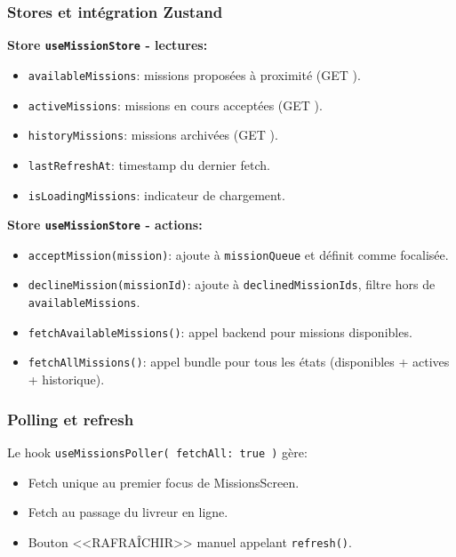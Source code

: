 \subsubsection{Stores et intégration Zustand}

\textbf{Store \texttt{useMissionStore} - lectures:}
\begin{itemize}
    \item \texttt{availableMissions}: missions proposées à proximité (GET ).
    \item \texttt{activeMissions}: missions en cours acceptées (GET ).
    \item \texttt{historyMissions}: missions archivées (GET ).
    \item \texttt{lastRefreshAt}: timestamp du dernier fetch.
    \item \texttt{isLoadingMissions}: indicateur de chargement.
\end{itemize}

\textbf{Store \texttt{useMissionStore} - actions:}
\begin{itemize}
    \item \texttt{acceptMission(mission)}: ajoute à \texttt{missionQueue} et définit comme focalisée.
    \item \texttt{declineMission(missionId)}: ajoute à \texttt{declinedMissionIds}, filtre hors de \texttt{availableMissions}.
    \item \texttt{fetchAvailableMissions()}: appel backend pour missions disponibles.
    \item \texttt{fetchAllMissions()}: appel bundle pour tous les états (disponibles + actives + historique).
\end{itemize}

\subsubsection{Polling et refresh}

Le hook \texttt{useMissionsPoller({ fetchAll: true })} gère:
\begin{itemize}
    \item Fetch unique au premier focus de MissionsScreen.
    \item Fetch au passage du livreur en ligne.
    \item Bouton <<RAFRAÎCHIR>> manuel appelant \texttt{refresh()}.
\end{itemize}

